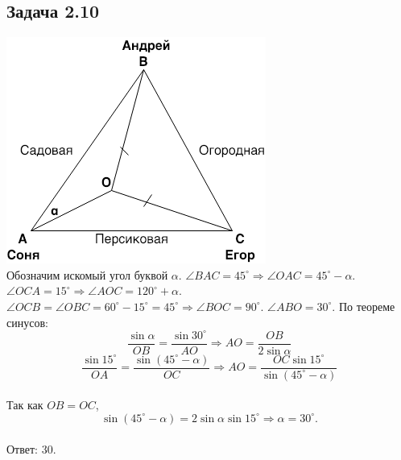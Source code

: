 \documentclass[12pt]{article}
\begin{document}
\subsection*{Задача 2.10}
\includegraphics{math210}\\
Обозначим искомый угол буквой $\alpha$. $\angle BAC = 45^\circ \Rightarrow \angle OAC = 45^\circ - \alpha$. $\angle OCA = 15^\circ \Rightarrow \angle AOC = 120^\circ + \alpha$. $\angle OCB = \angle OBC = 60^\circ - 15^\circ = 45^\circ \Rightarrow \angle BOC = 90^\circ$. $\angle ABO = 30^\circ$. По теореме синусов:
$$\frac{\sin\alpha}{OB} = \frac{\sin 30^\circ}{AO} \Rightarrow AO = \frac{OB}{2\sin\alpha}$$
$$\frac{\sin 15^\circ}{OA} = \frac{\sin (45^\circ - \alpha)}{OC} \Rightarrow AO = \frac{OC\sin 15^\circ}{\sin (45^\circ - \alpha)}$$ \\
Так как $OB = OC$, 
$$\sin (45^\circ - \alpha) = 2\sin\alpha \sin 15^\circ \Rightarrow \alpha = 30^\circ.$$\\
Ответ: 30.
\end{document}
